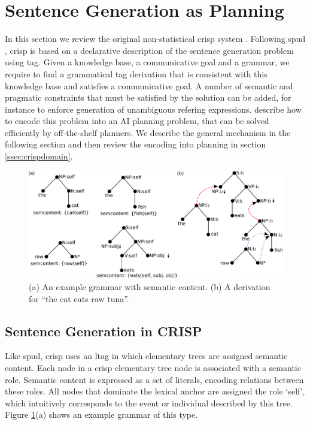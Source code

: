 \section{Sentence Generation as Planning}
\label{sec:crisp}
In this section we review the original non-statistical {\sc crisp} system \cite{kollerstone2007}. 
Following {\sc spud} \cite{stonedoran1997}, {\sc crisp} is based on a declarative description of the sentence generation problem using {\sc tag}. Given a knowledge base, a communicative goal and a grammar, we require to find a grammatical {\sc tag} derivation that is consistent with this knowledge base and satisfies a communicative goal. A number of semantic and pragmatic constraints that must be satisfied by the solution can be added, for instance to enforce generation of unambiguous refering expressions.  describe how to encode this problem into an AI planning problem, that can be solved efficiently by off-the-shelf planners. We describe the general mechanism in the following section and then review the encoding into planning in section \ref{ssec:crispdomain}. 
\begin{figure}[th]
\begin{center}
\includegraphics[width=.8\textwidth]{figures/grammar.pdf}
\caption{\label{fig:grammar}(a) An example grammar with semantic content. (b) A derivation for ``the cat eats raw tuna''. }
\end{center}
\end{figure}

\subsection{Sentence Generation in CRISP}
Like {\sc spud}, {\sc crisp} uses an {\sc ltag} in which elementary trees are assigned semantic content. Each node in a {\sc crisp} elementary tree node is associated with a semantic role. Semantic content is expressed as a set of literals, encoding relations between these roles. All nodes that dominate the lexical anchor are assigned the role `self', which intuitively corresponds to the event or individual described by this tree. Figure \ref{fig:grammar}(a) shows an example grammar of this type. 

